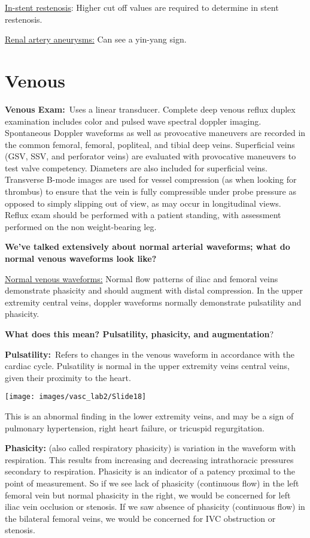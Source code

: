 \documentclass[
]{book}
\begin{document}
\uline{In-stent restenosis}: Higher cut off values are required to
determine in stent restenosis.\citep{chi2009, schäberle2016}

\uline{Renal artery aneurysms:} Can see a yin-yang sign.
\citep{gutta2008, ham2014}

\hypertarget{sec-venous}{%
\section{Venous}\label{sec-venous}}

\textbf{Venous Exam:}~Uses a linear transducer. Complete deep venous reflux
duplex examination includes color and pulsed wave spectral doppler
imaging. Spontaneous Doppler waveforms as well as provocative maneuvers
are recorded in the common femoral, femoral, popliteal, and tibial deep
veins. Superficial veins (GSV, SSV, and perforator veins) are evaluated
with provocative maneuvers to test valve competency. Diameters are also
included for superficial veins. Transverse B-mode images are used for
vessel compression (as when looking for thrombus) to ensure that the
vein is fully compressible under probe pressure as opposed to simply
slipping out of view, as may occur in longitudinal views. Reflux exam
should be performed with a patient standing, with assessment performed
on the non weight-bearing leg.

\textbf{We've talked extensively about normal arterial waveforms; what do
normal venous waveforms look like?}

\uline{Normal venous waveforms:} Normal flow patterns of iliac and
femoral veins demonstrate phasicity and should augment with distal
compression. In the upper extremity central veins, doppler waveforms
normally demonstrate pulsatility and phasicity.

\textbf{What does this mean? Pulsatility, phasicity, and augmentation}?

\textbf{Pulsatility:}~Refers to changes in the venous waveform in accordance
with the cardiac cycle. Pulsatility is normal in the upper extremity
veins central veins, given their proximity to the heart.

\texttt{[image: images/vasc\_lab2/Slide18]}

This is an abnormal finding in the lower extremity veins, and may be a
sign of pulmonary hypertension, right heart failure, or tricuspid
regurgitation.

\textbf{Phasicity:} (also called respiratory phasicity) is variation in the
waveform with respiration. This results from increasing and decreasing
intrathoracic pressures secondary to respiration. Phasicity is an
indicator of a patency proximal to the point of measurement. So if we
see lack of phasicity (continuous flow) in the left femoral vein but
normal phasicity in the right, we would be concerned for left iliac vein
occlusion or stenosis. If we saw absence of phasicity (continuous flow)
in the bilateral femoral veins, we would be concerned for IVC
obstruction or stenosis.
\end{document}
